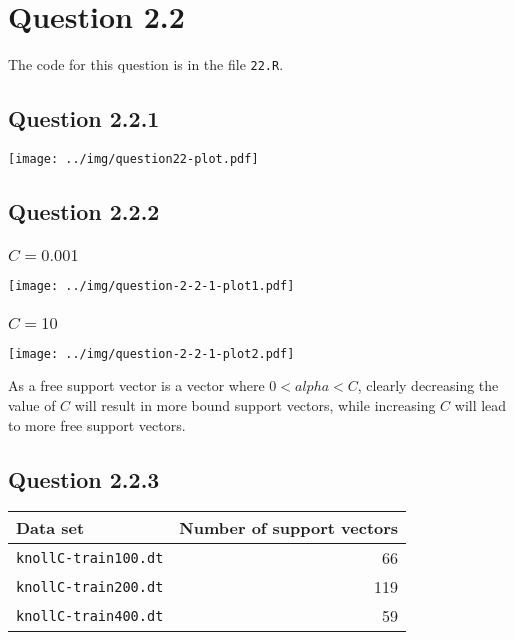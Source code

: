 \section*{Question 2.2}

The code for this question is in the file \texttt{22.R}.

\subsection*{Question 2.2.1}

\texttt{[image: ../img/question22-plot.pdf]}


\subsection*{Question 2.2.2}

\subsubsection*{$C=0.001$}
\texttt{[image: ../img/question-2-2-1-plot1.pdf]}
\subsubsection*{$C=10$}
\texttt{[image: ../img/question-2-2-1-plot2.pdf]}

As a free support vector is a vector where $0<alpha<C$, clearly
decreasing the value of $C$ will result in more bound support vectors,
while increasing $C$ will lead to more free support vectors.


\subsection*{Question 2.2.3}

\begin{tabular}{|l|r|}
\textbf{Data set} & \textbf{Number of support vectors} \\\hline
\texttt{knollC-train100.dt} & 66 \\
\texttt{knollC-train200.dt} & 119 \\
\texttt{knollC-train400.dt} & 59 \\
\end{tabular}

